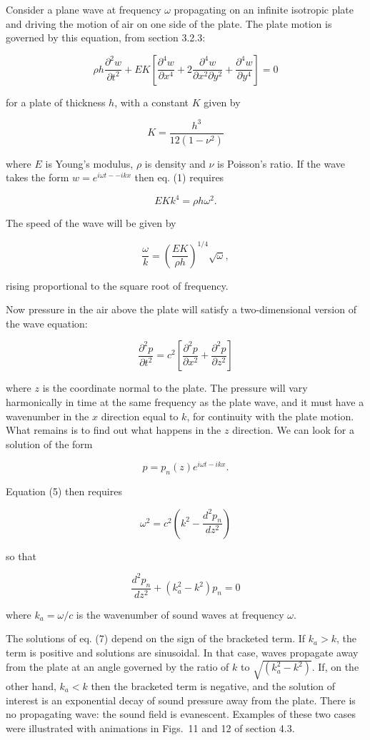   Consider a plane wave at frequency $\omega$ propagating on an infinite 
  isotropic plate and driving the motion of air on one side of the plate. The 
  plate motion is governed by this equation, from section 3.2.3: 

  $$\rho h \dfrac{\partial^2 w}{\partial t^2}+EK \left[\frac{\partial^4 
  w}{\partial x^4}+2\frac{\partial^4 w}{\partial x^2 \partial y^2} 
  +\frac{\partial^4 w}{\partial y^4} \right]=0\tag{1}$$ 

  for a plate of thickness $h$, with a constant $K$ given by 

  $$K=\frac{h^3}{12(1-\nu^2)} \tag{2}$$ 

  where $E$ is Young's modulus, $\rho$ is density and $\nu$ is Poisson's ratio. 
  If the wave takes the form $w=e^{i \omega t -- i k x}$ then eq. (1) requires 

  $$EK k^4=\rho h \omega^2. \tag{3}$$ 

  The speed of the wave will be given by 

  $$\frac{\omega}{k} = \left( \dfrac{EK}{\rho h} \right)^{1/4} \sqrt{\omega} 
  ,\tag{4}$$ 

  rising proportional to the square root of frequency. 

  Now pressure in the air above the plate will satisfy a two-dimensional 
  version of the wave equation: 

  $$\frac{\partial^2 p}{\partial t^2}= c^2 \left[ \frac{\partial^2 p}{\partial 
  x^2} + \frac{\partial^2 p}{\partial z^2} \right] \tag{5}$$ 

  where $z$ is the coordinate normal to the plate. The pressure will vary 
  harmonically in time at the same frequency as the plate wave, and it must 
  have a wavenumber in the $x$ direction equal to $k$, for continuity with the 
  plate motion. What remains is to find out what happens in the $z$ direction. 
  We can look for a solution of the form 

  $$p=p_n(z) e^{i \omega t -i k x} . \tag{6}$$ 

  Equation (5) then requires 

  $$\omega^2 = c^2\left( k^2 -\frac{d^2 p_n}{d z^2} \right)$$ 

  so that 

  $$\frac{d^2 p_n}{d z^2} + (k_a^2-k^2) p_n =0 \tag{7}$$ 

  where $k_a=\omega/c$ is the wavenumber of sound waves at frequency $\omega$. 

  The solutions of eq. (7) depend on the sign of the bracketed term. If $k_a > 
  k$, the term is positive and solutions are sinusoidal. In that case, waves 
  propagate away from the plate at an angle governed by the ratio of $k$ to 
  $\sqrt{(k_a^2-k^2)}$. If, on the other hand, $k_a < k$ then the bracketed 
  term is negative, and the solution of interest is an exponential decay of 
  sound pressure away from the plate. There is no propagating wave: the sound 
  field is evanescent. Examples of these two cases were illustrated with 
  animations in Figs.\ 11 and 12 of section 4.3. 

